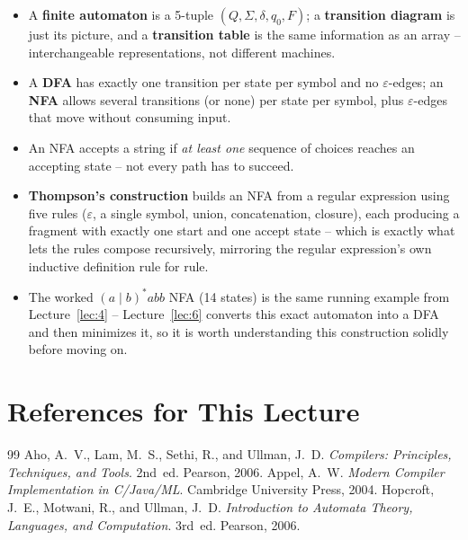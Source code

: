 \documentclass[full-course-notes.tex]{subfiles}
\begin{document}
\begin{takeaways}
\begin{itemize}
  \item A \textbf{finite automaton} is a 5-tuple $(Q, \Sigma, \delta, q_0, F)$; a
  \textbf{transition diagram} is just its picture, and a \textbf{transition table} is the same
  information as an array -- interchangeable representations, not different machines.
  \item A \textbf{DFA} has exactly one transition per state per symbol and no
  $\varepsilon$-edges; an \textbf{NFA} allows several transitions (or none) per state per
  symbol, plus $\varepsilon$-edges that move without consuming input.
  \item An NFA accepts a string if \emph{at least one} sequence of choices reaches an accepting
  state -- not every path has to succeed.
  \item \textbf{Thompson's construction} builds an NFA from a regular expression using five
  rules ($\varepsilon$, a single symbol, union, concatenation, closure), each producing a
  fragment with exactly one start and one accept state -- which is exactly what lets the rules
  compose recursively, mirroring the regular expression's own inductive definition rule for
  rule.
  \item The worked $(a\mid b)^{*}abb$ NFA (14 states) is the same running example from
  Lecture~\ref{lec:4} -- Lecture~\ref{lec:6} converts this exact automaton into a DFA and then
  minimizes it, so it is worth understanding this construction solidly before moving on.
\end{itemize}
\end{takeaways}

\section*{References for This Lecture}
\begin{thebibliography}{99}
 Aho, A.~V., Lam, M.~S., Sethi, R., and Ullman, J.~D. \textit{Compilers:
Principles, Techniques, and Tools}. 2nd~ed. Pearson, 2006.
 Appel, A.~W. \textit{Modern Compiler Implementation in C/Java/ML}. Cambridge
University Press, 2004.
 Hopcroft, J.~E., Motwani, R., and Ullman, J.~D. \textit{Introduction to
Automata Theory, Languages, and Computation}. 3rd~ed. Pearson, 2006.
\end{thebibliography}
\end{document}
